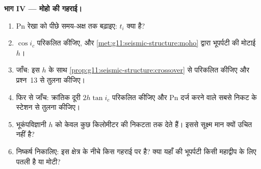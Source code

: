 \begin{problem}
\medskip
\noindent\textbf{भाग IV --- मोहो की गहराई।}
\begin{enumerate}[resume]
  \item Pn रेखा को पीछे समय-अक्ष तक बढ़ाइए: 
        $t_i$ क्या है?
  \item $\cos i_c$ परिकलित कीजिए, और \cref{met:g11:seismic-structure:moho} द्वारा
        भूपर्पटी की मोटाई $h$।
  \item जाँच: इस $h$ के साथ
        \cref{prop:g11:seismic-structure:crossover} से  परिकलित कीजिए और
        प्रश्न~13 से तुलना कीजिए।
  \item फिर से जाँच: क्रांतिक दूरी $2h\tan i_c$ परिकलित कीजिए और
        Pn दर्ज करने वाले सबसे निकट के स्टेशन से तुलना कीजिए।
  \item भूकंपविज्ञानी $h$ को केवल कुछ किलोमीटर की निकटता तक देते हैं। इससे
        सूक्ष्म मान क्यों उचित नहीं है?
  \item निष्कर्ष निकालिए: इस क्षेत्र के नीचे  किस गहराई पर है? क्या
        यहाँ की भूपर्पटी किसी महाद्वीप के लिए पतली है या मोटी?
\end{enumerate}
\end{problem}
